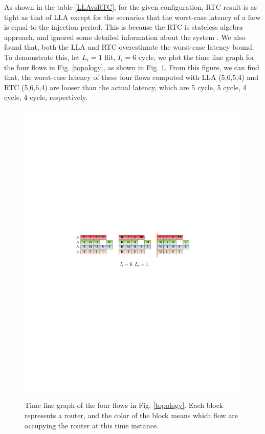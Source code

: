 \documentclass[10pt,journal]{IEEEtran}
\begin{document}
As shown in the table \ref{LLAvsRTC}, for the given configuration, RTC result is as tight as that of LLA except for the scenarios that the worst-case latency of a flow is equal to the injection period. This is because the RTC is stateless algebra approach, and ignored some detailed information about the system \cite{Phan2008MultiMode}. We also found that, both the LLA and RTC overestimate the worst-case latency bound. To demonstrate this, let $L_i=1$ flit, $I_i=6$ cycle, we plot the time line graph for the four flows in Fig. \ref{topology}, as shown in Fig. \ref{inaccurate}. From this figure, we can find that, the worst-case latency of these four flows computed with LLA (5,6,5,4) and RTC (5,6,6,4) are looser than the actual latency, which are 5 cycle, 5 cycle, 4 cycle, 4 cycle, respectively.
\begin{figure}
  \centering
  \includegraphics[scale=0.7]{figures/inaccurate.pdf}\\
  \caption{Time line graph of the four flows in Fig. \ref{topology}. Each block represents a router, and the color of the block means which flow are occupying the router at this time instance.}\label{inaccurate}
\end{figure}
\end{document}

